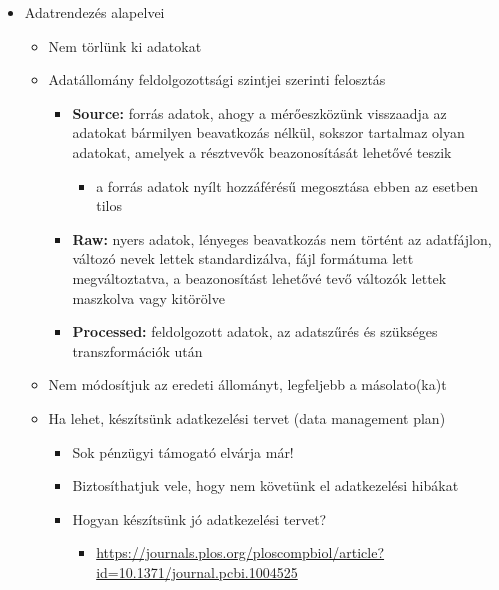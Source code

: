 \documentclass[
  letterpaper,
  DIV=11,
  numbers=noendperiod]{scrreprt}
\providecommand{\tightlist}{%
  \setlength{\itemsep}{0pt}\setlength{\parskip}{0pt}}\usepackage{longtable,booktabs,array}
\begin{document}
\begin{itemize}
\item
  Adatrendezés alapelvei

  \begin{itemize}
  \item
    Nem törlünk ki adatokat
  \item
    Adatállomány feldolgozottsági szintjei szerinti felosztás

    \begin{itemize}
    \item
      \textbf{Source:} forrás adatok, ahogy a mérőeszközünk visszaadja
      az adatokat bármilyen beavatkozás nélkül, sokszor tartalmaz olyan
      adatokat, amelyek a résztvevők beazonosítását lehetővé teszik

      \begin{itemize}
      \tightlist
      \item
        a forrás adatok nyílt hozzáférésű megosztása ebben az esetben
        tilos
      \end{itemize}
    \item
      \textbf{Raw:} nyers adatok, lényeges beavatkozás nem történt az
      adatfájlon, változó nevek lettek standardizálva, fájl formátuma
      lett megváltoztatva, a beazonosítást lehetővé tevő változók lettek
      maszkolva vagy kitörölve
    \item
      \textbf{Processed:} feldolgozott adatok, az adatszűrés és
      szükséges transzformációk után
    \end{itemize}
  \item
    Nem módosítjuk az eredeti állományt, legfeljebb a másolato(ka)t
  \item
    Ha lehet, készítsünk adatkezelési tervet (data management plan)

    \begin{itemize}
    \item
      Sok pénzügyi támogató elvárja már!
    \item
      Biztosíthatjuk vele, hogy nem követünk el adatkezelési hibákat
    \item
      Hogyan készítsünk jó adatkezelési tervet?

      \begin{itemize}
      \tightlist
      \item
        \url{https://journals.plos.org/ploscompbiol/article?id=10.1371/journal.pcbi.1004525}
      \end{itemize}
    \end{itemize}
  \end{itemize}
\end{itemize}
\end{document}
